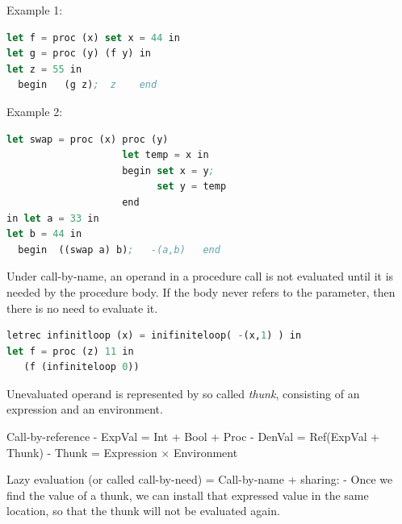 \documentclass{article}
\begin{document}
\begin{huge}

Example 1:
\begin{lstlisting}[language=Lisp]
let f = proc (x) set x = 44 in
let g = proc (y) (f y) in
let z = 55 in 
  begin   (g z);  z    end
\end{lstlisting}

Example 2:
\begin{lstlisting}[language=Lisp]
let swap = proc (x) proc (y) 
                    let temp = x in 
                    begin set x = y;
                          set y = temp
                    end
in let a = 33 in
let b = 44 in
  begin  ((swap a) b);   -(a,b)   end          
\end{lstlisting}


Under  call-by-name, an operand in a procedure call is not evaluated until it is needed by the procedure body. If the body never refers to the parameter, then there is no need to evaluate it.

\begin{lstlisting}[language=Lisp]
letrec infinitloop (x) = inifiniteloop( -(x,1) ) in
let f = proc (z) 11 in 
   (f (infiniteloop 0))
\end{lstlisting}

Unevaluated operand is represented by so called {\it thunk}, consisting of an expression and an environment.

Call-by-reference \al
- ExpVal = Int + Bool + Proc \al
- DenVal = Ref(ExpVal + Thunk) \al
- Thunk = Expression $\times$ Environment


Lazy evaluation (or called call-by-need) = Call-by-name + sharing: \al
- Once we find the value of a thunk, we can install that expressed value in the same location, so that the thunk will not be evaluated again. 

\end{huge} 
\end{document}
